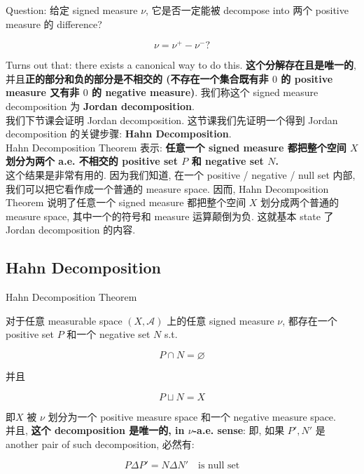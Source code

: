 \documentclass{qlnotes-export}
\begin{document}
Question: 给定 signed measure \(\nu\), 它是否一定能被 decompose into 两个 positive measure 的 difference?

\[\nu = \nu^{+} - \nu^{-}?\]

Turns out that: there exists a canonical way to do this. \textbf{这个分解存在且是唯一的}, 并且\textbf{正的部分和负的部分是不相交的 (不存在一个集合既有非 \(0\) 的 positive measure 又有非 \(0\) 的 negative measure)}. 我们称这个 signed measure decomposition 为 \textbf{Jordan decomposition}.\\
我们下节课会证明 Jordan decomposition. 这节课我们先证明一个得到 Jordan decomposition 的关键步骤: \textbf{Hahn Decomposition}.\\
Hahn Decomposition Theorem 表示: \textbf{任意一个 signed measure 都把整个空间 \(X\) 划分为两个 a.e. 不相交的 positive set \(P\) 和 negative set \(N\).}\\
这个结果是非常有用的. 因为我们知道, 在一个 positive / negative / null set 内部, 我们可以把它看作成一个普通的 measure space. 因而, Hahn Decomposition Theorem 说明了任意一个 signed measure 都把整个空间 \(X\) 划分成两个普通的 measure space, 其中一个的符号和 measure 运算颠倒为负. 这就基本 state 了 Jordan decomposition 的内容.

\subsection{Hahn Decomposition}\label{hahn-decomposition}

\begin{theorem}{Hahn Decomposition Theorem}\label{thm-10-signed-measure-jordan-decomposition-hahn-decomposition-theorem}

对于任意 measurable space \((X,\mathcal{A})\) 上的任意 signed measure \(\nu\), 都存在一个 positive set \(P\) 和一个 negative set \(N\) s.t.

\[P \cap N = \varnothing\]

并且

\[P \sqcup N = X\]

即\(X\) 被 \(\nu\) 划分为一个 positive measure space 和一个 negative measure space.\\
并且, \textbf{这个 decomposition 是唯一的, in \(\nu\)-a.e. sense}: 即, 如果 \(P',N'\) 是 another pair of such decomposition, 必然有:

\[P\Delta P' = N\Delta N'\quad\text{is null set}\]

\end{theorem}
\end{document}
